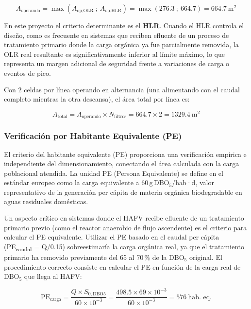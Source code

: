 \documentclass[12pt,a4paper]{article}
\begin{document}
\begin{equation}
A_\text{operando} = \max\!\left(A_\text{op,OLR}\ ;\ A_\text{op,HLR}\right) = \max\!\left(276.3\ ;\ 664.7\right) = 664.7\ \text{m}^2
\end{equation}

En este proyecto el criterio determinante es el \textbf{HLR}. Cuando el HLR controla el diseño, como es frecuente en sistemas que reciben efluente de un proceso de tratamiento primario donde la carga orgánica ya fue parcialmente removida, la OLR real resultante es significativamente inferior al límite máximo, lo que representa un margen adicional de seguridad frente a variaciones de carga o eventos de pico.

Con 2 celdas por línea operando en alternancia (una alimentando con el caudal completo mientras la otra descansa), el área total por línea es:

\begin{equation}
A_\text{total} = A_\text{operando} \times N_\text{filtros} = 664.7 \times 2 = 1329.4\ \text{m}^2
\end{equation}

\subsubsection*{Verificación por Habitante Equivalente (PE)}

El criterio del habitante equivalente (PE) proporciona una verificación empírica e independiente del dimensionamiento, conectando el área calculada con la carga poblacional atendida. La unidad PE (Persona Equivalente) se define en el estándar europeo como la carga equivalente a 60\,g\,DBO$_5$/hab·d, valor representativo de la generación per cápita de materia orgánica biodegradable en aguas residuales domésticas.

Un aspecto crítico en sistemas donde el HAFV recibe efluente de un tratamiento primario previo (como el reactor anaerobio de flujo ascendente) es el criterio para calcular el PE equivalente. Utilizar el PE basado en el caudal per cápita (PE\textsubscript{caudal} = Q/0.15) sobreestimaría la carga orgánica real, ya que el tratamiento primario ha removido previamente del 65 al 70\,\% de la DBO$_5$ original. El procedimiento correcto consiste en calcular el PE en función de la carga real de DBO$_5$ que llega al HAFV:

\begin{equation}
\text{PE}_\text{carga} = \frac{Q \times S_{0,\text{DBO5}}}{60 \times 10^{-3}} = \frac{498.5 \times 69 \times 10^{-3}}{60 \times 10^{-3}} = 576\ \text{hab. eq.}
\end{equation}
\end{document}
